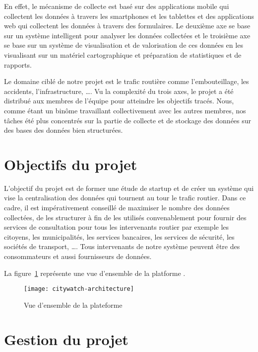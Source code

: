 En effet, le mécanisme de collecte est basé sur des applications mobile qui
collectent les données à travers les smartphones et les tablettes et des
applications web qui collectent les données à travers des formulaires. Le
deuxième axe se base sur un système intelligent pour analyser les données
collectées et le troisième axe se base sur un système de visualisation et de
valorisation de ces données en les visualisant sur un matériel cartographique
et préparation de statistiques et de rapports.

Le domaine ciblé de notre projet est le trafic routière comme l'embouteillage,
les accidents, l'infrastructure, \ldots.  Vu la complexité du trois axes, le
projet a été distribué aux membres de l'équipe  pour
atteindre les objectifs tracés. Nous, comme étant un binôme travaillant
collectivement avec les autres membres, nos tâches été plus concentrés sur la
partie de collecte et de stockage des données sur des bases des données bien
structurées.

\section{Objectifs du projet}

L'objectif du projet  est de former une étude de startup
et de créer un système qui vise la centralisation des données qui tournent au
tour le trafic routier. Dans ce cadre, il est impérativement conseillé de
maximiser le nombre des données collectées, de les structurer à fin de les
utilisés convenablement pour fournir des services de consultation pour tous les
intervenants routier par exemple les citoyens, les municipalités, les services
bancaires, les services de sécurité, les sociétés de transport, \ldots.  Tous
intervenants de notre système peuvent être des consommateurs et aussi
fournisseurs de données.

La figure~\ref{fig:citywatch-architecture} représente une vue d'ensemble de la
platforme .

\begin{figure}[!h]
    \centering
    \texttt{[image: citywatch-architecture]}
    \caption{Vue d'ensemble de la plateforme }
\label{fig:citywatch-architecture}
\end{figure}

\section{Gestion du projet }

